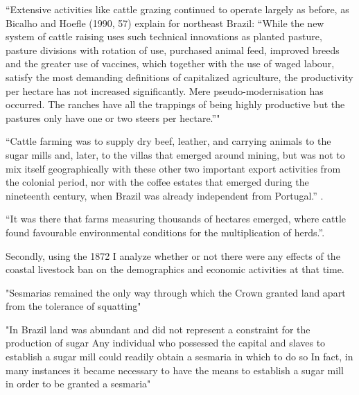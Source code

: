 \documentclass{article}
\begin{document}
\parencite{Carlson2019-mk} ``Extensive  activities  like  
cattle grazing continued to operate largely as before, as Bicalho and Hoefle (1990, 57) explain for northeast  Brazil: “While the new system of cattle raising uses such technical innovations as planted pasture, pasture  divisions with rotation of use, purchased animal feed, improved breeds and the greater use of vaccines, which  together  with  the  use  of  waged  labour,  satisfy  the  most  demanding  definitions  of  capitalized  agriculture,   the productivity per hectare has not increased significantly. Mere pseudo-modernisation has occurred. The  ranches have all the trappings of being highly productive but the pastures only have one or two steers per  hectare.”"

\parencite[p~.]{Boxer1962-bj}

``Cattle farming was to supply dry beef, leather, and carrying animals to the sugar mills and, later, to the villas that emerged around mining, but was not to mix itself geographically with these other two important export activities from the colonial period, nor with the coffee estates that emerged during the nineteenth century,  when  Brazil was already independent from  Portugal.'' \parencite{Ribeiro2012-lb}.

``It was there that farms measuring thousands of hectares emerged, where cattle found favourable environmental conditions for the multiplication of herds.''\parencite{Ribeiro2012-lb}.

Secondly, using the 1872 I analyze whether or not there were any effects of the coastal livestock ban on the demographics and economic activities at that time.


\textcite{Mueller1995-gi} 

"Sesmarias  remained the only way through  which the  Crown granted  land apart from the tolerance  of squatting" 

"In Brazil land was abundant  and did not represent a constraint  for the production  of sugar   Any individual who 
possessed the capital  and slaves to establish a sugar mill could readily obtain a sesmaria  in which to do so   In fact,  in   many instances  it became necessary to have the means to establish a sugar mill  in order to be granted a sesmaria"
\end{document}
